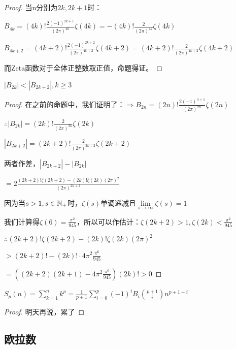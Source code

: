 \documentclass[12pt, a4paper, oneside, UTF8]{ctexbook}
\begin{document}
\begin{para}{0}
\begin{para}{1}
\begin{proof}
							当n分别为$2k,2k+1$时：
							
							$B_{4k} = (4k)!\frac{2(-1)^{2k+1}}{(2\pi)^{4k}}\zeta(4k)=-(4k)!\frac{2}{(2\pi)^{4k}}\zeta(4k)$
							
							$B_{4k+2} = (4k+2)!\frac{2(-1)^{2k+2}}{(2\pi)^{4k+2}}\zeta(4k+2)=(4k+2)!\frac{2}{(2\pi)^{4k+2}}\zeta(4k+2)$
							
							而Zeta函数对于全体正整数取正值，命题得证。
						\end{proof}
						\begin{proposition}
							$|B_{2k}|<|B_{2k+2}|,k \geqslant 3$
						\end{proposition}
						\begin{proof}
							在之前的命题中，我们证明了：$\Rightarrow B_{2n} = (2n)!\frac{2(-1)^{n+1}}{(2\pi)^{2n}}\zeta(2n)$
							
							$\therefore |B_{2k}| = (2k)!\frac{2}{(2\pi)^{2k}}\zeta(2k)$
							
							$|B_{2k+2}| = (2k+2)!\frac{2}{(2\pi)^{2k+2}}\zeta(2k+2)$
							
							两者作差，$|B_{2k+2}|-|B_{2k}|$
							
							$=2\frac{(2k+2)!\zeta(2k+2)-(2k)!\zeta(2k)(2\pi)^2}{(2\pi)^{2k+2}}$
							
							因为当$s>1,s \in \mathbb{N}_+$时，$\zeta(s)$单调递减且$\lim\limits_{s\to\infty}\zeta(s) = 1$
							
							我们计算得$\zeta(6)=\frac{\pi^2}{945}$，所以可以作估计：$\zeta(2k+2)>1,\zeta(2k)<\frac{\pi^2}{945}$
							
							$\therefore (2k+2)!\zeta(2k+2)-(2k)!\zeta(2k)(2\pi)^2$
							
							$> (2k+2)!-(2k)!\cdot 4\pi^2 \frac{\pi^6}{945}$
							
							$=\left((2k+2)(2k+1)- 4\pi^2 \frac{\pi^6}{945}\right)(2k)!>0$
							
						\end{proof}
					\begin{proposition}
						$S_p(n)=\sum\limits_{k=1}^{n}k^p=\frac{1}{p+1}\sum\limits_{i=0}^{p} (-1)^i B_i \binom{p+1}{i} n^{p+1-i}$
					\end{proposition}
					\begin{proof}
						明天再说，累了
					\end{proof}
				\end{para}
			\end{para}
		\subsection{欧拉数}
\end{document}
